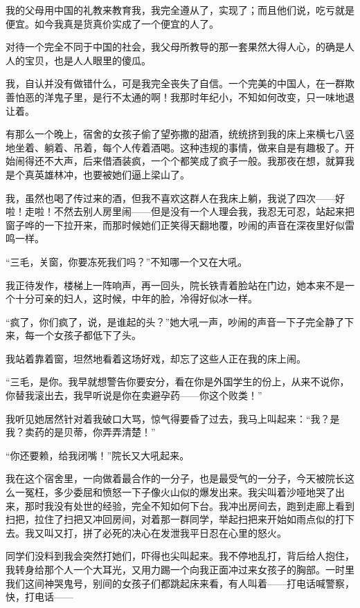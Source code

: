 \par 我的父母用中国的礼教来教育我，我完全遵从了，实现了；而且他们说，吃亏就是便宜。如今我真是货真价实成了一个便宜的人了。
\par 对待一个完全不同于中国的社会，我父母所教导的那一套果然大得人心，的确是人人的宝贝，也是人人眼里的傻瓜。
\par 我，自认并没有做错什么，可是我完全丧失了自信。一个完美的中国人，在一群欺善怕恶的洋鬼子里，是行不太通的啊！我那时年纪小，不知如何改变，只一味地退让着。
\par 有那么一个晚上，宿舍的女孩子偷了望弥撒的甜酒，统统挤到我的床上来横七八竖地坐着、躺着、吊着，每个人传着酒喝。这种违规的事情，做来自是有趣极了。开始闹得还不大声，后来借酒装疯，一个个都笑成了疯子一般。我那夜在想，就算我是个真英雄林冲，也要被她们逼上梁山了。
\par 我，虽然也喝了传过来的酒，但我不喜欢这群人在我床上躺，我说了四次——好啦！走啦！不然去别人房里闹——但是没有一个人理会我，我忍无可忍，站起来把窗子哗的一下拉开来，而那时候她们正笑得天翻地覆，吵闹的声音在深夜里好似雷鸣一样。
\par “三毛，关窗，你要冻死我们吗？”不知哪一个又在大吼。
\par 我正待发作，楼梯上一阵响声，再一回头，院长铁青着脸站在门边，她本来不是一个十分可亲的妇人，这时候，中年的脸，冷得好似冰一样。
\par “疯了，你们疯了，说，是谁起的头？”她大吼一声，吵闹的声音一下子完全静了下来，每一个女孩子都低下了头。
\par 我站着靠着窗，坦然地看着这场好戏，却忘了这些人正在我的床上闹。
\par “三毛，是你。我早就想警告你要安分，看在你是外国学生的份上，从来不说你，你替我滚出去，我早听说是你在卖避孕药——你这个败类！”
\par 我听见她居然针对着我破口大骂，惊气得要昏了过去，我马上叫起来：“我？是我？卖药的是贝蒂，你弄弄清楚！”
\par “你还要赖，给我闭嘴！”院长又大吼起来。
\par 我在这个宿舍里，一向做着最合作的一分子，也是最受气的一分子，今天被院长这么一冤枉，多少委屈和愤怒一下子像火山似的爆发出来。我尖叫着沙哑地哭了出来，那时我没有处世的经验，完全不知如何下台。我冲出房间去，跑到走廊上看到扫把，拉住了扫把又冲回房间，对着那一群同学，举起扫把来开始如雨点似的打下去。我又叫又打，拼了必死的决心在发泄我平日忍在心里的怒火。
\par 同学们没料到我会突然打她们，吓得也尖叫起来。我不停地乱打，背后给人抱住，我转身给那个人一个大耳光，又用力踢一个向我正面冲过来女孩子的胸部。一时里我们这间神哭鬼号，别间的女孩子们都跳起床来看，有人叫着——打电话喊警察，快，打电话——
